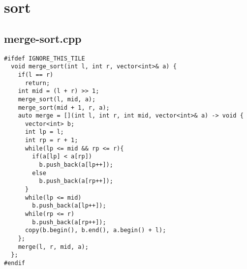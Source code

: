 \documentclass[UTF8, a4paper, titlepage, twoside]{ctexart}
\begin{document}
\clearpage
\section{sort}
\subsection{merge-sort.cpp}
\begin{verbatim}
#ifdef IGNORE_THIS_TILE
  void merge_sort(int l, int r, vector<int>& a) {
    if(l == r)
      return;
    int mid = (l + r) >> 1;
    merge_sort(l, mid, a);
    merge_sort(mid + 1, r, a);
    auto merge = [](int l, int r, int mid, vector<int>& a) -> void {
      vector<int> b;
      int lp = l;
      int rp = r + 1;
      while(lp <= mid && rp <= r){
        if(a[lp] < a[rp])
          b.push_back(a[lp++]);
        else  
          b.push_back(a[rp++]);
      }
      while(lp <= mid)
        b.push_back(a[lp++]);
      while(rp <= r)
        b.push_back(a[rp++]);
      copy(b.begin(), b.end(), a.begin() + l);
    };
    merge(l, r, mid, a);
  };
#endif
\end{verbatim}

\clearpage
\end{document}
